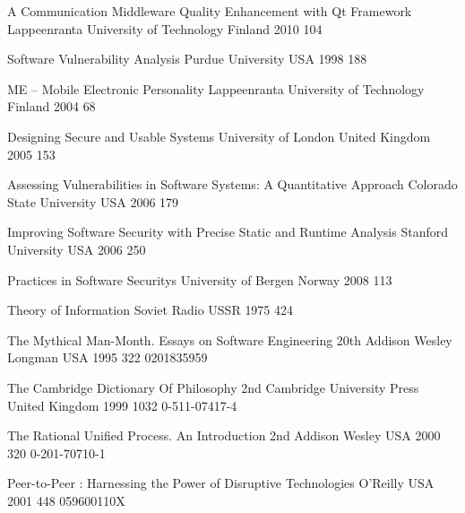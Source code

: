 \begin{thebibliography}{9}
		{}
		{A Communication Middleware Quality Enhancement with {Qt} Framework}
		{Lappeenranta University of Technology}
		{Finland}
		{2010}
		{104}


		{}
		{Software Vulnerability Analysis}
		{Purdue University}
		{USA}
		{1998}
		{188}

		{}
		{ME -- Mobile Electronic Personality}
		{Lappeenranta University of Technology}
		{Finland}
		{2004}
		{68}
		
		{}
		{Designing Secure and Usable Systems}
		{University of London}
		{United Kingdom}
		{2005}
		{153}
	
		{}
		{Assessing Vulnerabilities in Software Systems: A Quantitative Approach}
		{Colorado State University}
		{USA}
		{2006}
		{179}
		
		{}
		{Improving Software Security with Precise Static and Runtime Analysis}
		{Stanford University}
		{USA}
		{2006}
		{250}
	
		{}
		{Practices in Software Securitys}
		{University of Bergen}
		{Norway}
		{2008}
		{113}


		{}
		{Theory of Information}
		{}
		{Soviet Radio}
		{USSR}
		{1975}
		{424}
		{}

		{}
		{The Mythical Man-Month. Essays on Software Engineering}
		{20th}
		{Addison Wesley Longman}
		{USA}
		{1995}
		{322}
		{0201835959}
	
		{}
		{The {C}ambridge {D}ictionary Of {P}hilosophy}
		{2nd}
		{Cambridge University Press}
		{United Kingdom}
		{1999}
		{1032}
		{0-511-07417-4}
	
		{}
		{The Rational Unified Process. An Introduction}
		{2nd}
		{Addison Wesley}
		{USA}
		{2000}
		{320}
		{0-201-70710-1}

		{}
		{Peer-to-Peer : Harnessing the Power of Disruptive Technologies}
		{}
		{O'Reilly}
		{USA}
		{2001}
		{448}
		{059600110X}
		

\end{thebibliography}
